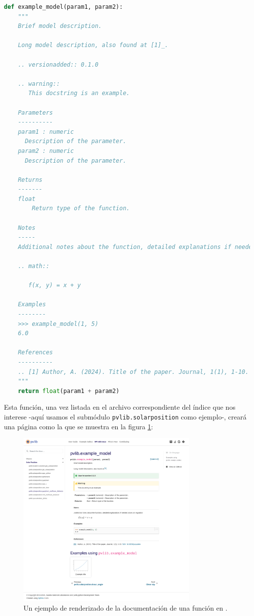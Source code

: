 \begin{lstlisting}[language=Python, caption={Ejemplo de documentación de una función en \pvlibpy.}, label={lst:doc_function_example}]
def example_model(param1, param2):
    """
    Brief model description.

    Long model description, also found at [1]_.

    .. versionadded:: 0.1.0

    .. warning::
       This docstring is an example.

    Parameters
    ----------
    param1 : numeric
      Description of the parameter.
    param2 : numeric
      Description of the parameter.

    Returns
    -------
    float
        Return type of the function.

    Notes
    -----
    Additional notes about the function, detailed explanations if needed. Even an equation:

    .. math::

       f(x, y) = x + y

    Examples
    --------
    >>> example_model(1, 5)
    6.0

    References
    ----------
    .. [1] Author, A. (2024). Title of the paper. Journal, 1(1), 1-10. :doi:`10.0001/populate`
    """
    return float(param1 + param2)
\end{lstlisting}

Esta función, una vez listada en el archivo correspondiente del índice que nos interese -aquí usamos el submódulo \texttt{pvlib.solarposition} como ejemplo-, creará una página como la que se muestra en la figura \ref{fig:doc_function_example}:

\begin{figure}[H]
    \centering
    \includegraphics[width=0.8\textwidth]{./images/how_to_document/function_stretch.png}
    \caption{Un ejemplo de renderizado de la documentación de una función en \pvlibpy.}
    \label{fig:doc_function_example}
\end{figure}

